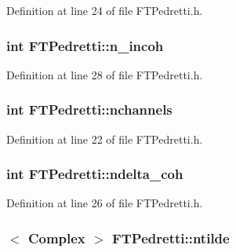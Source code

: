 Definition at line 24 of file FTPedretti.h.

\hypertarget{classFTPedretti_a80d65a4169e0885939736694bc76f4a8}{
\subsubsection[{n\_\-incoh}]{\setlength{\rightskip}{0pt plus 5cm}int {\bf FTPedretti::n\_\-incoh}}}
\label{classFTPedretti_a80d65a4169e0885939736694bc76f4a8}


Definition at line 28 of file FTPedretti.h.

\hypertarget{classFTPedretti_a617b319f056add9357e59becefdf629f}{
\subsubsection[{nchannels}]{\setlength{\rightskip}{0pt plus 5cm}int {\bf FTPedretti::nchannels}}}
\label{classFTPedretti_a617b319f056add9357e59becefdf629f}


Definition at line 22 of file FTPedretti.h.

\hypertarget{classFTPedretti_a62797d32a2a9efb508a6a50e37537bca}{
\subsubsection[{ndelta\_\-coh}]{\setlength{\rightskip}{0pt plus 5cm}int {\bf FTPedretti::ndelta\_\-coh}}}
\label{classFTPedretti_a62797d32a2a9efb508a6a50e37537bca}


Definition at line 26 of file FTPedretti.h.

\hypertarget{classFTPedretti_a974818e3a26fcb5bff164d3b6af61e50}{
\subsubsection[{ntilde}]{$<$ {\bf Complex} $>$ {\bf FTPedretti::ntilde}}}
\label{classFTPedretti_a974818e3a26fcb5bff164d3b6af61e50}


